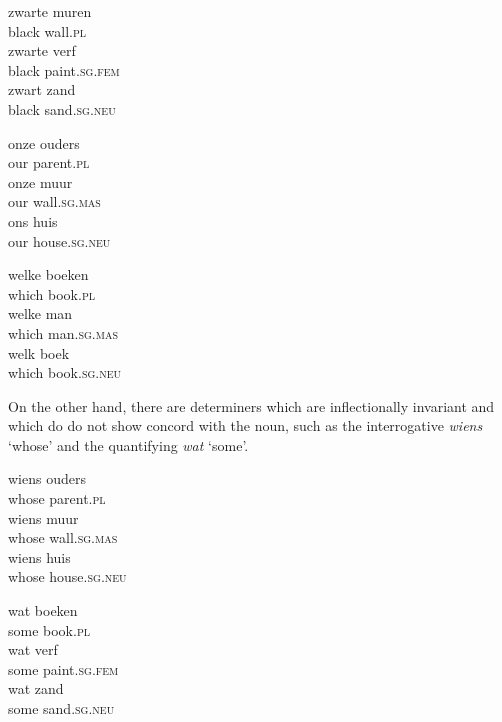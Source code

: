 \documentclass[output=paper
	        ,collection
	        ,collectionchapter
 	        ,biblatex
                ,babelshorthands
                ,newtxmath
                ,draftmode
                ,colorlinks, citecolor=brown
]{langscibook}
\begin{document}
\begin{exe} 
\ex\label{wit} 
\begin{xlist}
\ex
\gll  zwarte muren      \\
      black wall.\textsc{pl} \\
\ex
\gll  zwarte verf \\
      black paint.\textsc{sg.fem} \\
\ex
\gll  zwart zand \\
      black sand.\textsc{sg.neu} \\
\end{xlist}
\ex\label{ons}
\begin{xlist}
\ex
\gll onze ouders     \\
     our parent.\textsc{pl}  \\
\ex
\gll onze muur     \\
     our wall.\textsc{sg.mas}  \\
\ex
\gll ons huis     \\
     our house.\textsc{sg.neu}  \\
\end{xlist}
\ex\label{welk}
\begin{xlist} 
\ex
\gll welke boeken  \\
     which book.\textsc{pl} \\
\ex
\gll welke man                 \\
     which man.\textsc{sg.mas}  \\
\ex
\gll welk boek   \\
     which book.\textsc{sg.neu} \\
\end{xlist}
\end{exe} 

\noindent
On the other hand, there are determiners which are inflectionally invariant and which do 
do not show concord with the noun, such as the interrogative \emph{wiens} `whose' 
and the quantifying \emph{wat} `some'. 

\begin{exe} 
\ex\label{wiens}
\begin{xlist} 
\ex
\gll  wiens ouders \\ 
      whose parent.\textsc{pl} \\
\ex
\gll  wiens muur \\ 
      whose wall.\textsc{sg.mas} \\
\ex
\gll  wiens huis \\ 
      whose house.\textsc{sg.neu} \\
\end{xlist}
\ex\label{wat}
\begin{xlist}
\ex
\gll  wat boeken  \\
      some book.\textsc{pl} \\
\ex
\gll  wat verf                  \\
      some paint.\textsc{sg.fem} \\
\ex
\gll  wat zand  \\
      some sand.\textsc{sg.neu} \\
\end{xlist} 
\end{exe} 
\end{document}

